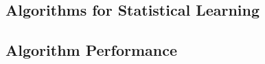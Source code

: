 \subsection{Algorithms for Statistical Learning}
\label{sec:algs}


\subsection{Algorithm Performance}
\label{sec:errs}


